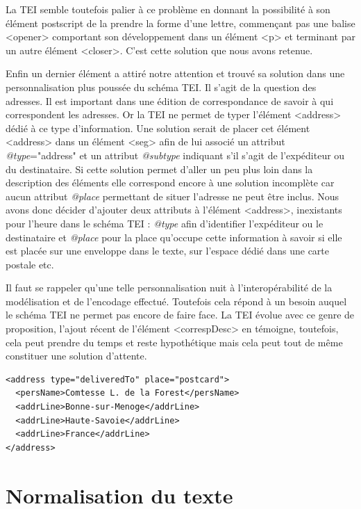 \documentclass[12pt,a4paper]{book} %
\begin{document}
La TEI semble toutefois palier à ce problème en donnant la possibilité à son élément postscript de la prendre la forme d'une lettre, commençant pas une balise <opener> comportant son développement dans un élément <p> et terminant par un autre élément <closer>. C'est cette solution que nous avons retenue.

Enfin un dernier élément a attiré notre attention et trouvé sa solution dans une personnalisation plus poussée du schéma TEI. Il s'agit de la question des adresses. Il est important dans une édition de correspondance de savoir à qui correspondent les adresses. Or la TEI ne permet de typer l'élément <address> dédié à ce type d'information. Une solution serait de placer cet élément <address> dans un élément <seg> afin de lui associé un attribut \textit{@type}="address" et un attribut \textit{@subtype} indiquant s'il s'agit de l'expéditeur ou du destinataire. Si cette solution permet d'aller un peu plus loin dans la description des éléments elle correspond encore à une solution incomplète car aucun attribut \textit{@place} permettant de situer l'adresse ne peut être inclus.
Nous avons donc décider d'ajouter deux attributs à l'élément <address>, inexistants pour l'heure dans le schéma TEI : \textit{@type} afin d'identifier l'expéditeur ou le destinataire et \textit{@place} pour la place qu'occupe cette information à savoir si elle est placée sur une enveloppe dans le texte, sur l'espace dédié dans une carte postale etc. 

Il faut se rappeler qu'une telle personnalisation nuit à l'interopérabilité de la modélisation et de l'encodage effectué. Toutefois cela répond à un besoin auquel le schéma TEI ne permet pas encore de faire face. La TEI évolue avec ce genre de proposition, l'ajout récent de l'élément <correspDesc> en témoigne, toutefois, cela peut prendre du temps et reste hypothétique mais cela peut tout de même constituer une solution d'attente.
\bigskip

\begin{lstlisting}
<address type="deliveredTo" place="postcard">         
  <persName>Comtesse L. de la Forest</persName>
  <addrLine>Bonne-sur-Menoge</addrLine>
  <addrLine>Haute-Savoie</addrLine>
  <addrLine>France</addrLine>
</address>
\end{lstlisting}
\bigskip

\section{Normalisation du texte}
\end{document}
